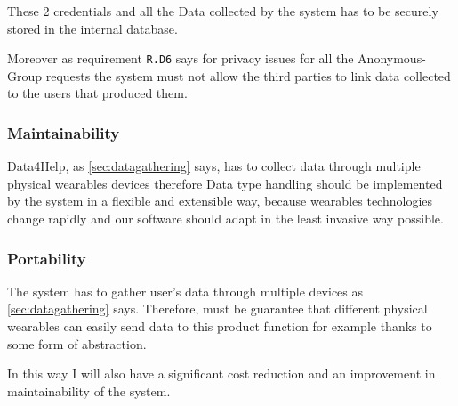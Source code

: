  These 2 credentials and all the Data collected by the system has to be securely stored in the internal database.

 Moreover as  requirement \texttt{R.D6} says for privacy issues for all the Anonymous-Group requests the system must not allow the third parties to link data collected to the users that produced them.

    \subsubsection{Maintainability}

      Data4Help, as \ref{sec:datagathering} says, has to collect data through multiple physical wearables devices therefore Data type handling should be implemented by the system in a flexible and extensible way, because wearables technologies change rapidly and our software should adapt in the least invasive way possible.

    \subsubsection{Portability}

      The system has to gather user's data through multiple devices as \ref{sec:datagathering} says. Therefore, must be guarantee that different physical wearables can easily send data to this product function for example thanks to some form of abstraction.

 In this way I will also have a significant cost reduction and an improvement in maintainability of the system.







